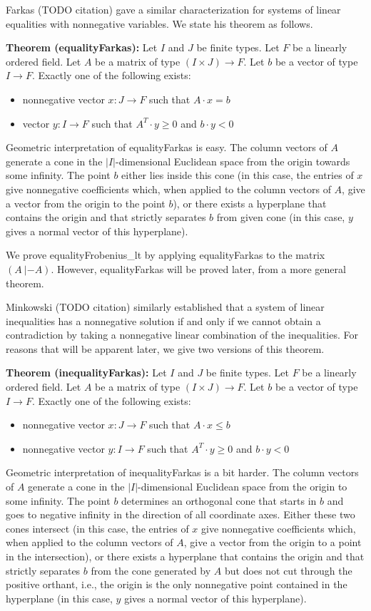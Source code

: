 \documentclass[]{article}
\renewcommand{\.}{\hskip .75pt}
\let\r=\rightarrow
\let\*=\cdot
\begin{document}
Farkas (TODO citation) gave a similar characterization for systems of linear equalities
with nonnegative variables.
We state his theorem as follows.

\medskip \noindent
\textbf{Theorem (equalityFarkas):}
Let $I$ and $J$ be finite types.
Let $F$ be a linearly ordered field.
Let $A$ be a matrix of type $(I \times J) \r F$.
Let $b$ be a vector of type $I \r F$.
Exactly one of the following exists:
\begin{itemize}
\item nonnegative vector $x : J \r F$ such that $A \* x = b$
\item vector $y : I \r F$ such that $A^T\! \* y \ge 0$ and $b \* y < 0$
\end{itemize}
Geometric interpretation of equalityFarkas is easy.
The column vectors of $A$ generate a cone in the
$|I|$-dimensional Euclidean space from the origin towards some infinity.
The point $b$ either lies inside this cone (in this case, the entries
of $x$ give nonnegative coefficients which,
when applied to the column vectors of $A$,
give a vector from the origin to the point $b$),
or there exists a hyperplane that contains the origin and that
strictly separates $b$ from given cone
(in this case, $y$ gives a normal vector of this hyperplane).

We prove equalityFrobenius\_lt by applying equalityFarkas to the matrix $(A~|-\!\! A)$.
However, equalityFarkas will be proved later, from a more general theorem.

Minkowski (TODO citation) similarly established that
a system of linear inequalities has a nonnegative solution if and only if
we cannot obtain a contradiction by taking a nonnegative linear combination of the inequalities.
For reasons that will be apparent later, we give two versions of this theorem.

\medskip \noindent
\textbf{Theorem (inequalityFarkas):}
Let $I$ and $J$ be finite types.
Let $F$ be a linearly ordered field.
Let $A$ be a matrix of type $(I \times J) \r F$.
Let $b$ be a vector of type $I \r F$.
Exactly one of the following exists:
\begin{itemize}
\item nonnegative vector $x : J \r F$ such that $A \* x \le b$
\item nonnegative vector $y : I \r F$ such that $A^T\! \* y \ge 0$ and $b \* y < 0$
\end{itemize}
Geometric interpretation of inequalityFarkas is a bit harder.
The column vectors of $A$ generate a cone in the
$|I|$-dimensional Euclidean space from the origin to some infinity.
The point $b$ determines an orthogonal cone that starts in $b$ and goes to
negative infinity in the direction of all coordinate axes.
Either these two cones intersect (in this case, the entries
of $x$ give nonnegative coefficients which,
when applied to the column vectors of $A$,
give a vector from the origin to a point in the intersection),
or there exists a hyperplane that contains the origin and that
strictly separates $b$ from the cone generated by $A$ but
does not cut through the positive orthant, i.e., the origin
is the only nonnegative point contained in the hyperplane
(in this case, $y$ gives a normal vector of this hyperplane).
\end{document}
